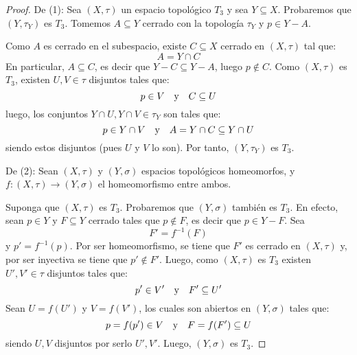 \documentclass[12pt]{report}
\theoremstyle{largebreak}
\newcommand\cf[3]{\ensuremath{#1:#2\rightarrow#3}}
\begin{document}
    \begin{proof}
        De (1): Sea $(X,\tau)$ un espacio topológico $T_3$ y sea $Y\subseteq X$. Probaremos que $(Y,\tau_Y)$ es $T_3$. Tomemos $A\subseteq Y$ cerrado con la topología $\tau_Y$ y $p\in Y-A$.

        Como $A$ es cerrado en el subespacio, existe $C\subseteq X$ cerrado en $(X,\tau)$ tal que:
        \begin{equation*}
            A=Y\cap C
        \end{equation*}
        En particular, $A\subseteq C$, es decir que $Y-C\subseteq Y-A$, luego $p\notin C$. Como $(X,\tau)$ es $T_3$, existen $U,V\in\tau$ disjuntos tales que:
        \begin{equation*}
            p\in V\quad\textup{y}\quad C\subseteq U
        \end{equation*}
        luego, los conjuntos $Y\cap U,Y\cap V\in \tau_Y$ son tales que:
        \begin{equation*}
            p\in Y\cap V\quad\textup{y}\quad A=Y\cap C\subseteq Y\cap U
        \end{equation*}
        siendo estos disjuntos (pues $U$ y $V$ lo son). Por tanto, $(Y,\tau_Y)$ es $T_3$.

        De (2): Sean $(X,\tau)$ y $(Y,\sigma)$ espacios topológicos homeomorfos, y $\cf{f}{(X,\tau)}{(Y,\sigma)}$ el homeomorfismo entre ambos.
    
        Suponga que $(X,\tau)$ es $T_3$. Probaremos que $(Y,\sigma)$ también es $T_3$. En efecto, sean $p\in Y$ y $F\subseteq Y$ cerrado tales que $p\notin F$, es decir que $p\in Y-F$.
        Sea
        \begin{equation*}
            F'=f^{-1}(F)
        \end{equation*}
        y $p'=f^{-1}(p)$. Por ser homeomorfismo, se tiene que $F'$ es cerrado en $(X,\tau)$ y, por ser inyectiva se tiene que $p'\notin F'$. Luego, como $(X,\tau)$ es $T_3$ existen $U',V'\in\tau$ disjuntos tales que:
        \begin{equation*}
            p'\in V'\quad\textup{y}\quad F'\subseteq U'
        \end{equation*}
        Sean $U=f(U')$ y $V=f(V')$, los cuales son abiertos en $(Y,\sigma)$ tales que:
        \begin{equation*}
            p=f(p')\in V\quad\textup{y}\quad F=f(F')\subseteq U
        \end{equation*}
        siendo $U,V$ disjuntos por serlo $U',V'$. Luego, $(Y,\sigma)$ es $T_3$.
    \end{proof}
\end{document}
